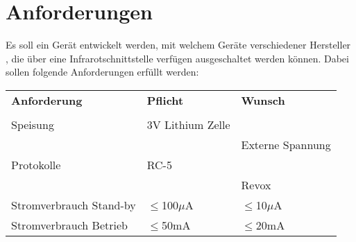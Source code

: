 



\section{Anforderungen}
Es soll ein Gerät entwickelt werden, mit welchem Geräte verschiedener 
Hersteller , die über eine Infrarotschnittstelle verfügen ausgeschaltet 
werden können. Dabei sollen folgende Anforderungen erfüllt werden: 

\begin{table}[h!]
  \begin{tabular}{@{}p{}p{}p{}}
    \rowcolor{white} \textbf{Anforderung}     & \textbf{Pflicht} & \textbf{Wunsch}\\
                                              &                  &                \\
    \rowcolor{white} Speisung                 & 3V Lithium Zelle &                \\
    \rowcolor{white}                          &                  & Externe Spannung\\
    \rowcolor{lgray} Protokolle               & RC-5             &                \\
    \rowcolor{lgray}                          &                  & Revox          \\
    \rowcolor{white} Stromverbrauch Stand-by  & $\leq$100$\mu$A  & $\leq$10$\mu$A \\
    \rowcolor{lgray} Stromverbrauch Betrieb   & $\leq$50mA       & $\leq$20mA     \\
  \end{tabular}
  \label{tab:anforderungen}
\end{table}
